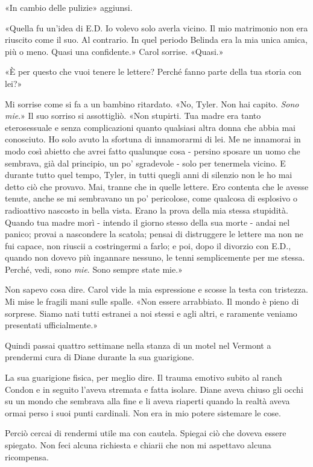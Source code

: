 «In cambio delle pulizie» aggiunsi.

«Quella fu un'idea di E.D. Io volevo solo averla vicino. Il mio
matrimonio non era riuscito come il suo. Al contrario. In quel periodo
Belinda era la mia unica amica, più o meno. Quasi una confidente.» Carol
sorrise. «Quasi.»

«È per questo che vuoi tenere le lettere? Perché fanno parte della tua
storia con lei?»

Mi sorrise come si fa a un bambino ritardato. «No, Tyler. Non hai
capito. \emph{Sono mie}.» Il suo sorriso si assottigliò. «Non stupirti.
Tua madre era tanto eterosessuale e senza complicazioni quanto qualsiasi
altra donna che abbia mai conosciuto. Ho solo avuto la sfortuna di
innamorarmi di lei. Me ne innamorai in modo così abietto che avrei fatto
qualunque cosa - persino sposare un uomo che sembrava, già dal
principio, un po' sgradevole - solo per tenermela vicino. E durante
tutto quel tempo, Tyler, in tutti quegli anni di silenzio non le ho mai
detto ciò che provavo. Mai, tranne che in quelle lettere. Ero contenta
che le avesse tenute, anche se mi sembravano un po' pericolose, come
qualcosa di esplosivo o radioattivo nascosto in bella vista. Erano la
prova della mia stessa stupidità. Quando tua madre morì - intendo il
giorno stesso della sua morte - andai nel panico; provai a nascondere la
scatola; pensai di distruggere le lettere ma non ne fui capace, non
riuscii a costringermi a farlo; e poi, dopo il divorzio con E.D., quando
non dovevo più ingannare nessuno, le tenni semplicemente per me stessa.
Perché, vedi, sono \emph{mie}. Sono sempre state mie.»

Non sapevo cosa dire. Carol vide la mia espressione e scosse la testa
con tristezza. Mi mise le fragili mani sulle spalle. «Non essere
arrabbiato. Il mondo è pieno di sorprese. Siamo nati tutti estranei a
noi stessi e agli altri, e raramente veniamo presentati ufficialmente.»

\separatorefiori

Quindi passai quattro settimane nella stanza di un motel nel Vermont a
prendermi cura di Diane durante la sua guarigione.

La sua guarigione fisica, per meglio dire. Il trauma emotivo subito al
ranch Condon e in seguito l'aveva stremata e fatta isolare. Diane aveva
chiuso gli occhi su un mondo che sembrava alla fine e li aveva riaperti
quando la realtà aveva ormai perso i suoi punti cardinali. Non era in
mio potere sistemare le cose.

Perciò cercai di rendermi utile ma con cautela. Spiegai ciò che doveva
essere spiegato. Non feci alcuna richiesta e chiarii che non mi
aspettavo alcuna ricompensa.


